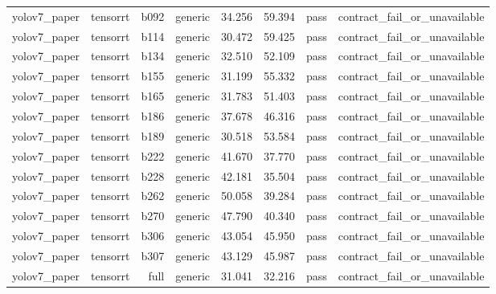 \begin{table}[t]
\begin{tabular}{lrrrrrrr}
yolov7\_paper & tensorrt & b092 & generic & 34.256 & 59.394 & pass & contract\_fail\_or\_unavailable \\
yolov7\_paper & tensorrt & b114 & generic & 30.472 & 59.425 & pass & contract\_fail\_or\_unavailable \\
yolov7\_paper & tensorrt & b134 & generic & 32.510 & 52.109 & pass & contract\_fail\_or\_unavailable \\
yolov7\_paper & tensorrt & b155 & generic & 31.199 & 55.332 & pass & contract\_fail\_or\_unavailable \\
yolov7\_paper & tensorrt & b165 & generic & 31.783 & 51.403 & pass & contract\_fail\_or\_unavailable \\
yolov7\_paper & tensorrt & b186 & generic & 37.678 & 46.316 & pass & contract\_fail\_or\_unavailable \\
yolov7\_paper & tensorrt & b189 & generic & 30.518 & 53.584 & pass & contract\_fail\_or\_unavailable \\
yolov7\_paper & tensorrt & b222 & generic & 41.670 & 37.770 & pass & contract\_fail\_or\_unavailable \\
yolov7\_paper & tensorrt & b228 & generic & 42.181 & 35.504 & pass & contract\_fail\_or\_unavailable \\
yolov7\_paper & tensorrt & b262 & generic & 50.058 & 39.284 & pass & contract\_fail\_or\_unavailable \\
yolov7\_paper & tensorrt & b270 & generic & 47.790 & 40.340 & pass & contract\_fail\_or\_unavailable \\
yolov7\_paper & tensorrt & b306 & generic & 43.054 & 45.950 & pass & contract\_fail\_or\_unavailable \\
yolov7\_paper & tensorrt & b307 & generic & 43.129 & 45.987 & pass & contract\_fail\_or\_unavailable \\
yolov7\_paper & tensorrt & full & generic & 31.041 & 32.216 & pass & contract\_fail\_or\_unavailable \\
\bottomrule
\end{tabular}
\end{table}
